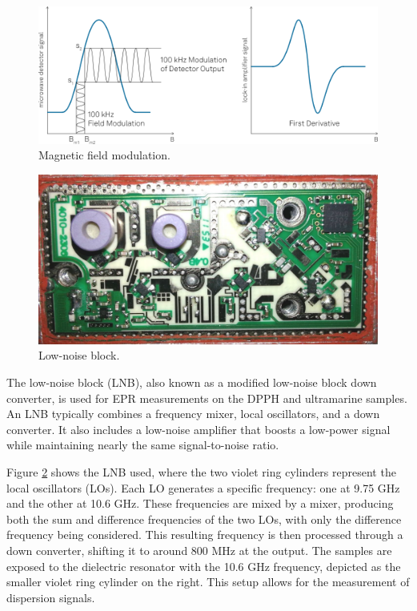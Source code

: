 \documentclass{article}
\begin{document}
\begin{figure}[h]
	\centering
	\includegraphics[width=\textwidth]{Figures/Intro/Field_Modulation.png}
	\caption{Magnetic field modulation. \cite{a2019_electron}}
	\label{fig:field_modulation}
\end{figure}

\pagebreak{}

\begin{figure}[h]
	\centering
	\includegraphics[width=\textwidth]{Figures/Intro/LNB.png}
	\caption{Low-noise block. \cite{departmentofphysicsandgeosciences_2001_electronparamagnetic}}
	\label{fig:lnb}
\end{figure}

The low-noise block (LNB), also known as a modified low-noise block down converter, is used for EPR measurements on the DPPH and ultramarine samples. An LNB typically combines a frequency mixer, local oscillators, and a down converter. It also includes a low-noise amplifier that boosts a low-power signal while maintaining nearly the same signal-to-noise ratio.

Figure \ref{fig:lnb} shows the LNB used, where the two violet ring cylinders represent the local oscillators (LOs). Each LO generates a specific frequency: one at 9.75 GHz and the other at 10.6 GHz. These frequencies are mixed by a mixer, producing both the sum and difference frequencies of the two LOs, with only the difference frequency being considered. This resulting frequency is then processed through a down converter, shifting it to around 800 MHz at the output. The samples are exposed to the dielectric resonator with the 10.6 GHz frequency, depicted as the smaller violet ring cylinder on the right. This setup allows for the measurement of dispersion signals.
\end{document}
